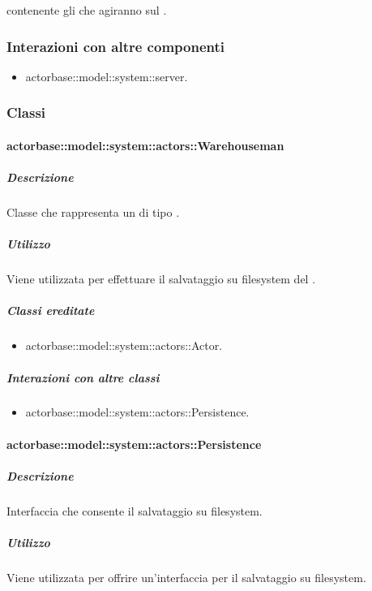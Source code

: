 \documentclass{scalatekids-article}
\begin{document}
 contenente gli  che agiranno sul .

\subsubsection{Interazioni con altre componenti}

\begin{itemize}
\item actorbase::model::system::server.
\end{itemize}

\subsubsection{Classi}

\paragraph{actorbase::model::system::actors::Warehouseman}

\subparagraph{Descrizione}

Classe che rappresenta un  di tipo .

\subparagraph{Utilizzo}

Viene utilizzata per effettuare il salvataggio su filesystem del
.

\subparagraph{Classi ereditate}

\begin{itemize}
\item actorbase::model::system::actors::Actor.
\end{itemize}

\subparagraph{Interazioni con altre classi}

\begin{itemize}
\item actorbase::model::system::actors::Persistence.
\end{itemize}

\paragraph{actorbase::model::system::actors::Persistence}

\subparagraph{Descrizione}

Interfaccia che consente il salvataggio su filesystem.

\subparagraph{Utilizzo}

Viene utilizzata per offrire un'interfaccia per il salvataggio su filesystem.
\end{document}
